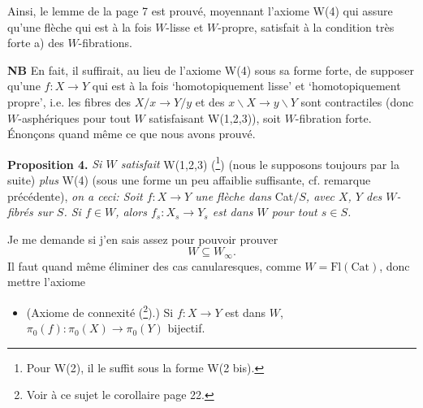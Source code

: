 \documentclass[11pt]{article}
\newcommand{\printedpage}[1]{\marginpar{\footnotesize p.~#1}}
\begin{document}
\printedpage{9}

Ainsi, le lemme de la page 7 est prouvé, moyennant l'axiome W(4) qui assure qu'une flèche qui est à la fois $W$-lisse et $W$-propre, satisfait à la condition très forte a) des $W$-fibrations.

\textbf{NB} En fait, il suffirait, au lieu de l'axiome W(4) sous sa forme forte, de supposer qu'une $f : X \longrightarrow Y$ qui est à la fois `homotopiquement lisse' et `homotopiquement propre', i.e. les fibres des $X/x \longrightarrow Y/y$ et des $x\backslash X \longrightarrow y\backslash Y$ sont contractiles (donc $W$-asphériques pour tout $W$ satisfaisant W(1,2,3)), soit $W$-fibration forte. Énonçons quand même ce que nous avons prouvé.

\textbf{Proposition 4.} \textit{Si $W$ satisfait} W(1,2,3) (\footnote[17]{Pour W(2), il le suffit sous la forme W(2 bis).}) (nous le supposons toujours par la suite) \textit{plus} W(4) (sous une forme un peu affaiblie suffisante, cf. remarque précédente), \textit{on a ceci: Soit $f : X \longrightarrow Y$ une flèche dans} Cat$/S$\textit{, avec $X$, $Y$ des $W$-fibrés sur $S$. Si $f \in W$, alors $f_s : X_s \longrightarrow Y_s$ est dans $W$ pour tout $s \in S$.}

Je me demande si j'en sais assez pour pouvoir prouver
\[ W \subseteq W_\infty . \]
Il faut quand même éliminer des cas canularesques, comme $W = \mathrm{Fl}(\mathrm{Cat})$, donc mettre l'axiome

\begin{itemize}[leftmargin=4em, labelwidth=3em, labelsep=0.6em]
\item[W(5)] (Axiome de connexité (\footnote[18]{Voir à ce sujet le corollaire page 22.}).) Si $f : X \longrightarrow Y$ est dans $W$, $\pi_0(f) : \pi_0(X) \longrightarrow \pi_0(Y)$ bijectif.
\end{itemize}
\end{document}
